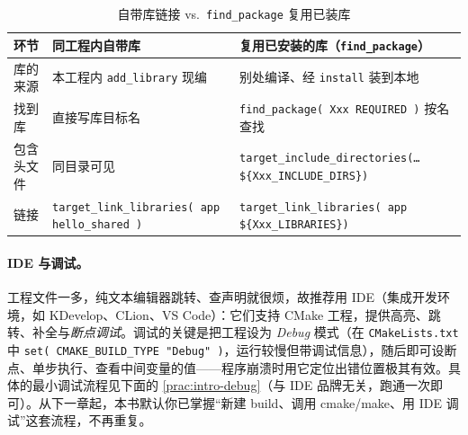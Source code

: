 \begin{table}[H]\centering\small
\caption{自带库链接 vs.\ \texttt{find\_package} 复用已装库}
\label{tab:intro-findpkg}
\begin{tabular}{p{} p{} p{}}
\toprule
环节 & 同工程内自带库 & 复用已安装的库（\texttt{find\_package}）\\
\midrule
库的来源 & 本工程内 \texttt{add\_library} 现编 & 别处编译、经 \texttt{install} 装到本地 \\
找到库 & 直接写库目标名 & \texttt{find\_package( Xxx REQUIRED )} 按名查找 \\
包含头文件 & 同目录可见 & \texttt{target\_include\_directories(\dots \$\{Xxx\_INCLUDE\_DIRS\})} \\
链接 & \texttt{target\_link\_libraries( app hello\_shared )} & \texttt{target\_link\_libraries( app \$\{Xxx\_LIBRARIES\})} \\
\bottomrule
\end{tabular}
\end{table}

\paragraph{IDE 与调试。}
工程文件一多，纯文本编辑器跳转、查声明就很烦，故推荐用 IDE（集成开发环境，如 KDevelop、CLion、VS Code）：它们支持 CMake 工程，提供高亮、跳转、补全与\emph{断点调试}。调试的关键是把工程设为 \emph{Debug} 模式（在 \texttt{CMakeLists.txt} 中 \texttt{set( CMAKE\_BUILD\_TYPE "Debug" )}，运行较慢但带调试信息），随后即可设断点、单步执行、查看中间变量的值——程序崩溃时用它定位出错位置极其有效。具体的最小调试流程见下面的 \cref{prac:intro-debug}（与 IDE 品牌无关，跑通一次即可）。从下一章起，本书默认你已掌握“新建 build、调用 cmake/make、用 IDE 调试”这套流程，不再重复。

